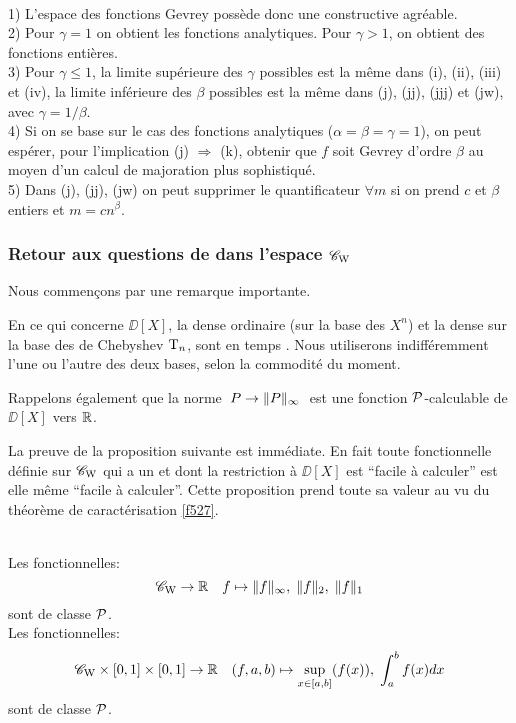 \begin{fremarks} \label{f525}~\\
1)  L'espace des fonctions Gevrey possède donc une \pres constructive 
agréable.\\
2)  Pour  $\gamma = 1$ on obtient les fonctions analytiques. Pour  $\gamma > 1$, 
on obtient des fonctions entières.\\
3)  Pour $\gamma \leq 1$, la limite supérieure des $ \gamma $ possibles est la 
même dans  (i),  (ii),  (iii)  et  (iv),  la limite inférieure des $\beta$ 
possibles est la même dans  (j),  (jj),  (jjj)  et  (jw),  avec
$\gamma = 1/ \beta$. \\
4)  Si on se base sur le cas des fonctions analytiques  
($\alpha = \beta = \gamma = 1$), 
on peut espérer, pour l'implication  (j) $\Rightarrow$ (k),
 obtenir que $f$ soit  Gevrey d'ordre $\beta$  au moyen d'un calcul de 
majoration plus sophistiqué.\\
5)  Dans  (j),  (jj),  (jw)  on peut supprimer le quantificateur $\forall m$   
si on prend $ c $ et $\beta$ entiers  et $m = cn^{\beta}$.
\end{fremarks} 


\subsubsection{Retour aux questions de \com dans l'espace  ${{{\mathscr C}}_{\rm W}}$}
\label{fsubsubsec 523}
Nous commençons par une remarque importante.

\smallskip {}  En ce qui concerne  $\DD[X]$, la \pres dense ordinaire  (sur la base des  $X^n$)  et la \pres dense sur la base des \pols de Chebyshev   ${\rm T}_n$, sont \equivas en temps \poll. Nous utiliserons indifféremment l'une ou l'autre des deux bases, selon la commodité du moment.

\medskip  Rappelons également que la norme 
$\; P \to \lVert  P  \rVert_{\infty}\; $ 
 est une fonction ${\cal P}$-calculable de $\DD[X]$  vers $\mathbb {R}$.

La preuve de la proposition suivante est immédiate. En fait toute 
fonctionnelle définie sur  ${{{\mathscr C}}_{\rm W}}$  qui a un \mcu \poll et dont la 
restriction à  $\DD[X]$  est ``facile à calculer'' est elle même ``facile 
à calculer''. Cette proposition prend toute sa valeur au vu du théorème de 
caractérisation \ref{f527}. 

\begin{fproposition} \label{f526}~ \\ 
Les fonctionnelles:
\[
{{{\mathscr C}}_{\rm W}} \to \mathbb {R} \quad  f \mapsto \lVert f \rVert_{\infty}, \; \lVert f \rVert_2, \; \lVert f \rVert_1
\]
  sont  \uni de classe  ${\cal P}$.\\
Les fonctionnelles:
\[
{{{\mathscr C}}_{\rm W}} \times [0,1] \times [0,1] \to \mathbb {R} \quad  (f,a,b) \mapsto \sup_{x 
\in [a,b]} (f(x)), \; \int_{a}^{b} f(x) dx
\]
sont  \uni de classe  ${\cal P}$.
\end{fproposition}

